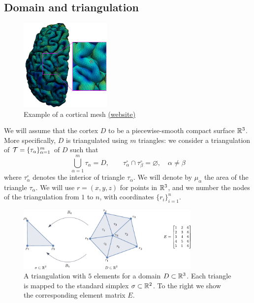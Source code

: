 \documentclass[a4paper]{siamonline220329}
\theoremstyle{plain}
\begin{document}
\subsection{Domain and triangulation} \label{ssec:triangulation}

\begin{figure}
  \begin{center}
    \includegraphics[width=0.4\textwidth]{brain-mesh}
  \end{center}
  \caption{Example of a cortical mesh
    \href{https://www.med.unc.edu/bric/scientists-create-new-map-of-the-developing-cerebral-cortex/}{(website)}
  }
\end{figure}
We will assume that the cortex $D$ to be a piecewise-smooth compact surface
$\mathbb{R}^3$. More specifically, $D$ is triangulated using $m$ triangles: we consider a
triangulation of $\mathcal{T} = \{ \tau_\alpha \}_{\alpha = 1}^m$ of $D$ such
that 
\[ 
  \bigcup_{\alpha=1}^m \tau_\alpha = D, \qquad 
  \tau_\alpha^\circ \cap \tau_\beta^\circ = \varnothing, \quad \alpha \neq \beta 
\] 
where $\tau_\alpha^\circ$ denotes the interior of triangle $\tau_{\alpha}$. We will
denote by $\mu_\alpha$ the area of the triangle $\tau_\alpha$. We will use
$r=(x,y,z)$ for points in $\mathbb{R}^3$, and we number the nodes of the triangulation
from $1$ to $n$, with coordinates $\{ r_i \}_{i=1}^n$.


\begin{figure}
  \centering
  \includegraphics[width = 0.8\textwidth]{triangulation}
  \caption{A triangulation with $5$ elements for a domain $D \subset \mathbb{R}^3$. Each
  triangle is mapped to the standard simplex $\sigma \subset \mathbb{R}^2$. To the right
we show the corresponding element matrix $E$.}
  \label{fig:triangulation}
\end{figure}
\end{document}
